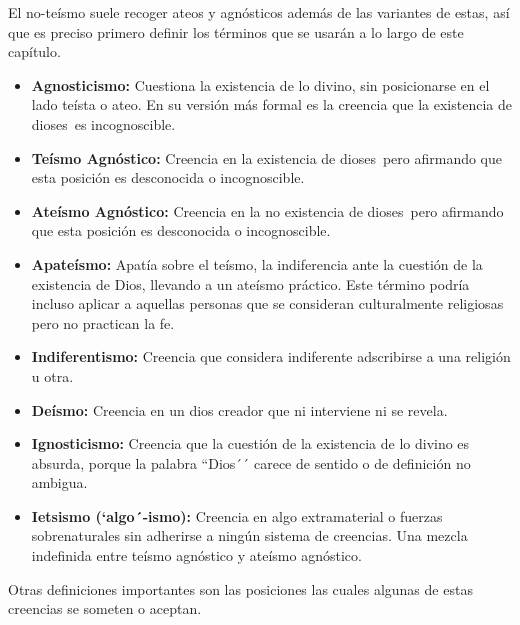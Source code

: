 \documentclass[12pt]{report}
\begin{document}
	
	El no-teísmo suele recoger ateos y agnósticos además de las variantes de estas, así que es preciso primero definir los términos que se usarán a lo largo de este capítulo. 
	
	\begin{minibloque}[Definiciones]
		\begin{itemize}
			\item \textbf{Agnosticismo:} Cuestiona la existencia de lo divino, sin posicionarse en el lado teísta o ateo. En su versión más formal es la creencia que la existencia de dios\textlangle es\textrangle\ es incognoscible.
			\item \textbf{Teísmo Agnóstico:} Creencia en la existencia de dios\textlangle es\textrangle\ pero afirmando que esta posición es desconocida o incognoscible.
			\item \textbf{Ateísmo Agnóstico:} Creencia en la no existencia de dios\textlangle es\textrangle\ pero afirmando que esta posición es desconocida o incognoscible.
			\item \textbf{Apateísmo:} Apatía sobre el teísmo, la indiferencia ante la cuestión de la existencia de Dios, llevando a un ateísmo práctico. Este término podría incluso aplicar a aquellas personas que se consideran culturalmente religiosas pero no practican la fe.
			\item \textbf{Indiferentismo:} Creencia que considera indiferente adscribirse a una religión u otra.
			\item \textbf{Deísmo:} Creencia en un dios creador que ni interviene ni se revela.
			\item \textbf{Ignosticismo:} Creencia que la cuestión de la existencia de lo divino es absurda, porque la palabra ``Dios´´ carece de sentido o de definición no ambigua.
			\item \textbf{Ietsismo (`algo´-ismo):} Creencia en algo extramaterial o fuerzas sobrenaturales sin adherirse a ningún sistema de creencias. Una mezcla indefinida entre teísmo agnóstico y ateísmo agnóstico.
		\end{itemize}
	\end{minibloque}
	
	Otras definiciones importantes son las posiciones las cuales algunas de estas creencias se someten o aceptan.
	
\end{document}
